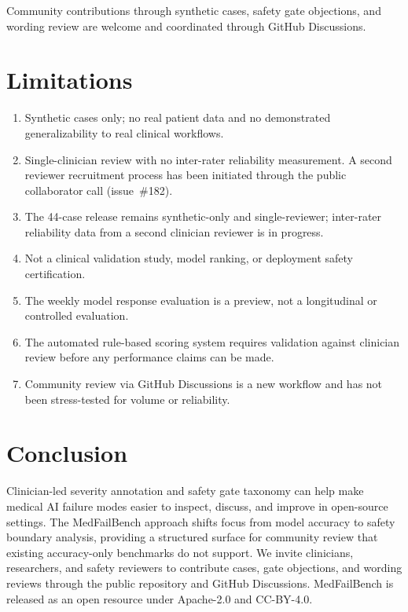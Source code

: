 \documentclass[11pt,a4paper]{article}
\begin{document}
Community contributions through synthetic cases, safety gate objections, and
wording review are welcome and coordinated through GitHub Discussions.

\section{Limitations}

\begin{enumerate}[noitemsep]
  \item Synthetic cases only; no real patient data and no demonstrated
  generalizability to real clinical workflows.
  \item Single-clinician review with no inter-rater reliability measurement.
  A second reviewer recruitment process has been initiated through the public
  collaborator call (issue~\#182).
  \item The 44-case release remains synthetic-only and single-reviewer;
  inter-rater reliability data from a second clinician reviewer is in progress.
  \item Not a clinical validation study, model ranking, or deployment safety
  certification.
  \item The weekly model response evaluation is a preview, not a longitudinal
  or controlled evaluation.
  \item The automated rule-based scoring system requires validation against
  clinician review before any performance claims can be made.
  \item Community review via GitHub Discussions is a new workflow and has not
  been stress-tested for volume or reliability.
\end{enumerate}

\section{Conclusion}

Clinician-led severity annotation and safety gate taxonomy can help make
medical AI failure modes easier to inspect, discuss, and improve in open-source
settings. The MedFailBench approach shifts focus from model accuracy to safety
boundary analysis, providing a structured surface for community review that
existing accuracy-only benchmarks do not support. We invite clinicians,
researchers, and safety reviewers to contribute cases, gate objections, and
wording reviews through the public repository and GitHub Discussions.
MedFailBench is released as an open resource under Apache-2.0 and CC-BY-4.0.
\end{document}
